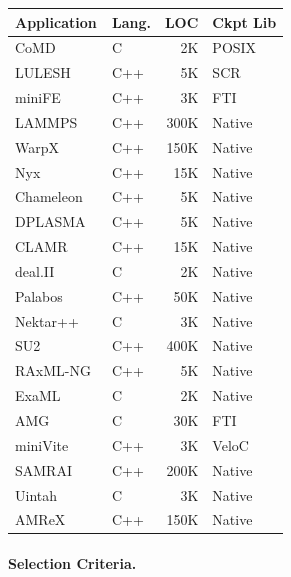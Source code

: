 \noindent
\begin{minipage}{\columnwidth}
\label{tab:apps}
\footnotesize
\centering
\setlength{\tabcolsep}{3pt}
\begin{tabular}{@{}llrl@{}}
\toprule
\textbf{Application} & \textbf{Lang.} & \textbf{LOC} & \textbf{Ckpt Lib} \\
\midrule
CoMD~\cite{comd}          & C   &   2K & POSIX \\
LULESH~\cite{lulesh}      & C++ &   5K & SCR~\cite{scr} \\
miniFE~\cite{minife}      & C++ &   3K & FTI~\cite{fti} \\
LAMMPS~\cite{lammps}      & C++ & 300K & Native \\
WarpX~\cite{warpx}        & C++ & 150K & Native \\
Nyx~\cite{nyx}            & C++ &  15K & Native \\
Chameleon~\cite{chameleon} & C++ &   5K & Native \\
DPLASMA~\cite{dplasma}    & C++ &   5K & Native \\
CLAMR~\cite{clamr}        & C++ &  15K & Native \\
deal.II~\cite{dealii}     & C   &   2K & Native \\
Palabos~\cite{palabos}    & C++ &  50K & Native \\
Nektar++~\cite{nektar}    & C   &   3K & Native \\
SU2~\cite{su2}            & C++ & 400K & Native \\
RAxML-NG~\cite{raxml-ng}  & C++ &   5K & Native \\
ExaML~\cite{examl}        & C   &   2K & Native \\
AMG~\cite{amg}            & C   &  30K & FTI~\cite{fti} \\
miniVite~\cite{minivite}  & C++ &   3K & VeloC~\cite{veloc} \\
SAMRAI~\cite{samrai}      & C++ & 200K & Native \\
Uintah~\cite{uintah}      & C   &   3K & Native \\
AMReX~\cite{amrex}        & C++ & 150K & Native \\
\bottomrule
\end{tabular}
\end{minipage}

\paragraph{Selection Criteria.}

